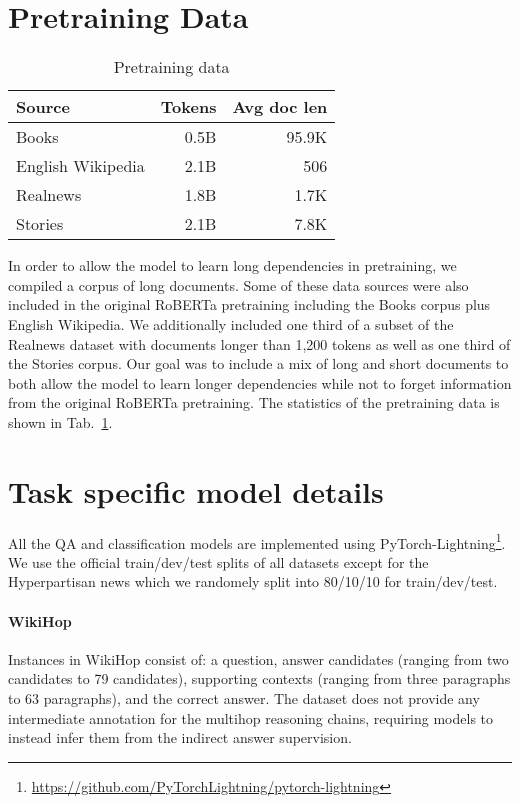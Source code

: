 \documentclass[11pt,a4paper]{article}
\begin{document}
\section{Pretraining Data}
\label{sec:mlm_data}

\begin{table}[t]
\centering
\small
\begin{tabular}{@{}lrr@{}}
\toprule
Source    & Tokens & Avg doc len \\ \midrule
Books \cite{Zhu2015AligningBA}    & 0.5B              & 95.9K\\
English Wikipedia & 2.1B              & 506 \\
Realnews \cite{Zellers2019DefendingAN}  & 1.8B              & 1.7K\\
Stories \cite{Trinh2018ASM}  & 2.1B              & 7.8K \\ \bottomrule
\end{tabular}
\caption{Pretraining data}\label{tab:pretrain-data}
\end{table}

In order to allow the model to learn long dependencies in pretraining, we compiled a corpus of long documents. Some of these data sources were also included in the original RoBERTa pretraining including the Books corpus \cite{Zhu2015AligningBA} plus English Wikipedia. We additionally included one third of a subset of the Realnews dataset \cite{Zellers2019DefendingAN} with documents longer than 1,200 tokens as well as one third of the Stories \cite{Trinh2018ASM} corpus. Our goal was to include a mix of long and short documents to both allow the model to learn longer dependencies while not to forget information from the original RoBERTa pretraining. The statistics of the pretraining data is shown in Tab.~\ref{tab:pretrain-data}.


\section{Task specific model details}
All the QA and classification models are implemented using PyTorch-Lightning\footnote{\url{https://github.com/PyTorchLightning/pytorch-lightning}}.  We use the official train/dev/test splits of all datasets except for the Hyperpartisan news which we randomely split into 80/10/10 for train/dev/test.

\label{sec:taskdetails}

\paragraph{WikiHop} Instances in WikiHop consist of: a question, answer candidates (ranging from two candidates to 79 candidates), supporting contexts (ranging from three paragraphs to 63 paragraphs), and the correct answer.  The dataset does not provide any intermediate annotation for the multihop reasoning chains, requiring models to instead infer them from the indirect answer supervision.
\end{document}
